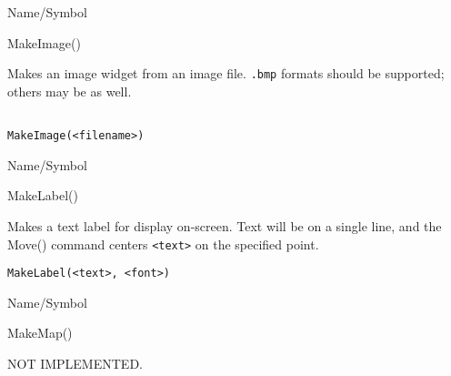 \rl



\begin{desc}{Name/Symbol}
\item[Name/Symbol]	MakeImage()

\item[Description]	Makes an image widget from an image file.
		\texttt{.bmp} formats should be supported; others may be as well.

\item[Usage]		
\begin{verbatim}

MakeImage(<filename>)
\end{verbatim}

\item[Example]	

\item[See Also]	
\end{desc}

\rl




\begin{desc}{Name/Symbol}
\item[Name/Symbol]	MakeLabel()

\item[Description]	Makes a text label for display on-screen. Text will be 
		on a single line, and the Move() command centers \verb+<text>+
		on the specified point.

\item[Usage]
\begin{verbatim}
MakeLabel(<text>, <font>)
\end{verbatim}

\item[Example]	

\item[See Also]	
\end{desc}

\rl




\begin{desc}{Name/Symbol}
\item[Name/Symbol]	MakeMap()

\item[Description]	NOT IMPLEMENTED.

\item[Usage]		

\item[Example]	

\item[See Also]	
\end{desc}

